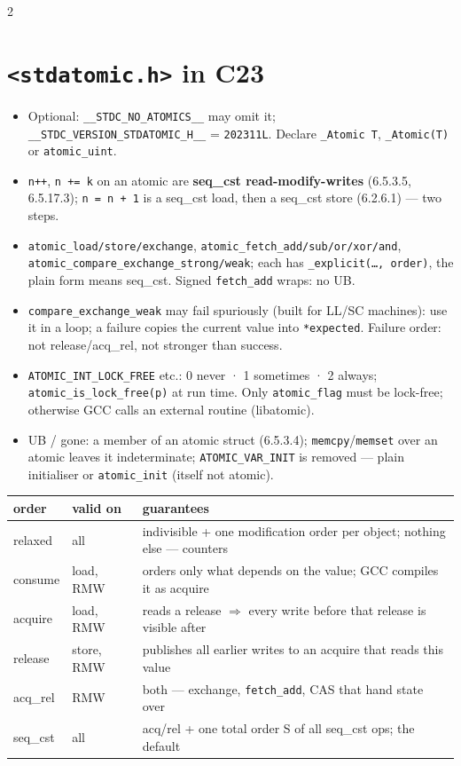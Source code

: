\documentclass[8pt]{extarticle}
\newcommand\ct[1]{\texttt{#1}}
\begin{document}
\begin{multicols}{2}
\section{\texttt{<stdatomic.h>} in C23}
\begin{itemize}
  \item Optional: \ct{\_\_STDC\_NO\_ATOMICS\_\_} may omit it; \ct{\_\_STDC\_VERSION\_STDATOMIC\_H\_\_}
        = \ct{202311L}. Declare \ct{\_Atomic T}, \ct{\_Atomic(T)} or \ct{atomic\_uint}.
  \item \ct{n++}, \ct{n += k} on an atomic are \textbf{seq\_cst read-modify-writes}
        (6.5.3.5, 6.5.17.3); \ct{n = n + 1} is a seq\_cst load, then a seq\_cst store (6.2.6.1)
        — two steps.
  \item \ct{atomic\_load/store/exchange}, \ct{atomic\_fetch\_add/sub/or/xor/and},
        \ct{atomic\_compare\_exchange\_strong/weak}; each has \ct{\_explicit(…, order)}, the
        plain form means seq\_cst. Signed \ct{fetch\_add} wraps: no UB.
  \item \ct{compare\_exchange\_weak} may fail spuriously (built for LL/SC machines): use it in a
        loop; a failure copies the current value into \ct{*expected}. Failure order: not
        release/acq\_rel, not stronger than success.
  \item \ct{ATOMIC\_INT\_LOCK\_FREE} etc.: 0 never · 1 sometimes · 2 always;
        \ct{atomic\_is\_lock\_free(p)} at run time. Only \ct{atomic\_flag} must be lock-free;
        otherwise GCC calls an external routine (libatomic).
  \item UB / gone: a member of an atomic struct (6.5.3.4); \ct{memcpy}/\ct{memset} over an
        atomic leaves it indeterminate; \ct{ATOMIC\_VAR\_INIT} is removed — plain initialiser or
        \ct{atomic\_init} (itself not atomic).
\end{itemize}

{\scriptsize\setlength{\tabcolsep}{2pt}
\begin{tabular}{@{}>{\ttfamily\raggedright\arraybackslash}p{10mm}>{\raggedright\arraybackslash}p{11mm}>{\raggedright\arraybackslash}p{56mm}@{}}
\toprule
\normalfont\textbf{order} & \textbf{valid on} & \textbf{guarantees}\\
\midrule
relaxed & all & indivisible + one modification order per object; nothing else — counters\\
consume & load, RMW & orders only what depends on the value; GCC compiles it as acquire\\
acquire & load, RMW & reads a release $\Rightarrow$ every write before that release is visible after\\
release & store, RMW & publishes all earlier writes to an acquire that reads this value\\
acq\_rel & RMW & both — exchange, \ct{fetch\_add}, CAS that hand state over\\
seq\_cst & all & acq/rel + one total order S of all seq\_cst ops; the default\\
\bottomrule
\end{tabular}}


\end{multicols}
\end{document}
